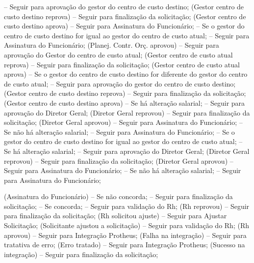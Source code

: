                                  -- Seguir para aprovação do gestor do centro de custo destino;
                                    (Gestor centro de custo destino reprova)
                                       -- Seguir para finalização da solicitação;
                                    (Gestor centro de custo destino aprova)
                                       -- Seguir para Assinatura do Funcionário;
                              -- Se o gestor do centro de custo destino for igual ao gestor do centro de custo atual;
                                 -- Seguir para Assinatura do Funcionário;
         (Planej. Contr. Orç. aprovou)
            -- Seguir para aprovação do Gestor do centro de custo atual;
               (Gestor centro de custo atual reprova)
                  -- Seguir para finalização da solicitação;
               (Gestor centro de custo atual aprova)
                  -- Se o gestor do centro de custo destino for diferente do gestor do centro de custo atual;
                     -- Seguir para aprovação do gestor do centro de custo destino;
                        (Gestor centro de custo destino reprova)
                           -- Seguir para finalização da solicitação;
                        (Gestor centro de custo destino aprova)
                           -- Se há alteração salarial;
                              -- Seguir para aprovação do Diretor Geral;
                                 (Diretor Geral reprovou)
                                    -- Seguir para finalização da solicitação;
                                 (Diretor Geral aprovou)
                                    -- Seguir para Assinatura do Funcionário;
                           -- Se não há alteração salarial;
                              -- Seguir para Assinatura do Funcionário;
                  -- Se o gestor do centro de custo destino for igual ao gestor do centro de custo atual;
                     -- Se há alteração salarial;
                        -- Seguir para aprovação do Diretor Geral;
                           (Diretor Geral reprovou)
                              -- Seguir para finalização da solicitação;
                           (Diretor Geral aprovou)
                              -- Seguir para Assinatura do Funcionário;
                     -- Se não há alteração salarial;
                        -- Seguir para Assinatura do Funcionário;

(Assinatura do Funcionário)
   -- Se não concorda;
      -- Seguir para finalização da solicitação;
   -- Se concorda;
      -- Seguir para validação do Rh;
         (Rh reprovou)
            -- Seguir para finalização da solicitação;
         (Rh solicitou ajuste)
            -- Seguir para Ajustar Solicitação;
                  (Solicitante ajustou a solicitação)
                     -- Seguir para validação do Rh;
         (Rh aprovou)
            -- Seguir para Integração Protheus;
               (Falha na integração)
                  -- Seguir para tratativa de erro;
                     (Erro tratado)
                        -- Seguir para Integração Protheus;
               (Sucesso na integração)
                  -- Seguir para finalização da solicitação;
